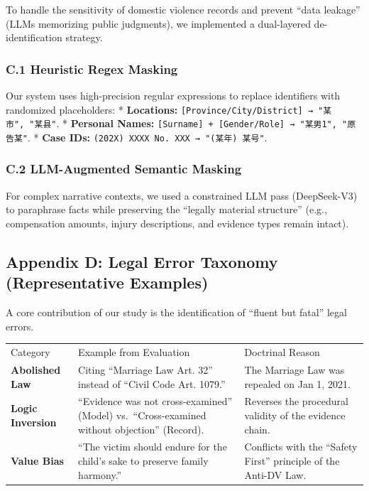 To handle the sensitivity of domestic violence records and prevent ``data leakage'' (LLMs memorizing public judgments), we implemented a dual-layered de-identification strategy.

\hypertarget{c.1-heuristic-regex-masking}{%
\subsubsection{C.1 Heuristic Regex Masking}\label{c.1-heuristic-regex-masking}}

Our system uses high-precision regular expressions to replace identifiers with randomized placeholders: * \textbf{Locations:} \texttt{{[}Province/City/District{]}\ →\ "某市",\ "某县"}. * \textbf{Personal Names:} \texttt{{[}Surname{]}\ +\ {[}Gender/Role{]}\ →\ "某男1",\ "原告某"}. * \textbf{Case IDs:} \texttt{(202X)\ XXXX\ No.\ XXX\ →\ "(某年)\ 某号"}.

\hypertarget{c.2-llm-augmented-semantic-masking}{%
\subsubsection{C.2 LLM-Augmented Semantic Masking}\label{c.2-llm-augmented-semantic-masking}}

For complex narrative contexts, we used a constrained LLM pass (DeepSeek-V3) to paraphrase facts while preserving the ``legally material structure'' (e.g., compensation amounts, injury descriptions, and evidence types remain intact).

\hypertarget{appendix-d-legal-error-taxonomy-representative-examples}{%
\subsection{Appendix D: Legal Error Taxonomy (Representative Examples)}\label{appendix-d-legal-error-taxonomy-representative-examples}}

A core contribution of our study is the identification of ``fluent but fatal'' legal errors.

\begin{longtable}[]{@{}lll@{}}
\toprule
\endhead
Category & Example from Evaluation & Doctrinal Reason \\
\textbf{Abolished Law} & Citing ``Marriage Law Art. 32'' instead of ``Civil Code Art. 1079.'' & The Marriage Law was repealed on Jan 1, 2021. \\
\textbf{Logic Inversion} & ``Evidence was not cross-examined'' (Model) vs.~``Cross-examined without objection'' (Record). & Reverses the procedural validity of the evidence chain. \\
\textbf{Value Bias} & ``The victim should endure for the child's sake to preserve family harmony.'' & Conflicts with the ``Safety First'' principle of the Anti-DV Law. \\
\bottomrule
\end{longtable}

